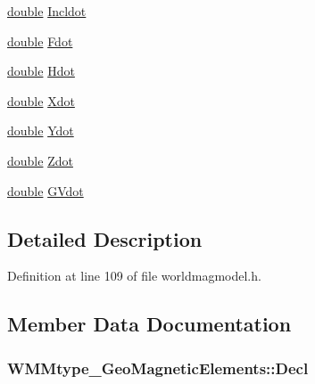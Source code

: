 \begin{DoxyCompactItemize}
\item 
\hyperlink{_super_l_u_support_8h_a8956b2b9f49bf918deed98379d159ca7}{double} \hyperlink{struct_w_m_mtype___geo_magnetic_elements_ad42b26463a764fbbe5fa6fe815d81f00}{Incldot}
\item 
\hyperlink{_super_l_u_support_8h_a8956b2b9f49bf918deed98379d159ca7}{double} \hyperlink{struct_w_m_mtype___geo_magnetic_elements_a9a1465364de801ea9a6567f63aeddff7}{Fdot}
\item 
\hyperlink{_super_l_u_support_8h_a8956b2b9f49bf918deed98379d159ca7}{double} \hyperlink{struct_w_m_mtype___geo_magnetic_elements_a4f48837b7b954edff150a6994ff80720}{Hdot}
\item 
\hyperlink{_super_l_u_support_8h_a8956b2b9f49bf918deed98379d159ca7}{double} \hyperlink{struct_w_m_mtype___geo_magnetic_elements_a98363bfa933b65aae742479e14dc209a}{Xdot}
\item 
\hyperlink{_super_l_u_support_8h_a8956b2b9f49bf918deed98379d159ca7}{double} \hyperlink{struct_w_m_mtype___geo_magnetic_elements_aaecfb6ce93c718489c1d0982d43d56b6}{Ydot}
\item 
\hyperlink{_super_l_u_support_8h_a8956b2b9f49bf918deed98379d159ca7}{double} \hyperlink{struct_w_m_mtype___geo_magnetic_elements_a105c49de1702144d115e20ba6272a2c6}{Zdot}
\item 
\hyperlink{_super_l_u_support_8h_a8956b2b9f49bf918deed98379d159ca7}{double} \hyperlink{struct_w_m_mtype___geo_magnetic_elements_abd5895b4add30e1d0a36e0b86ab9af22}{G\-Vdot}
\end{DoxyCompactItemize}


\subsection{Detailed Description}


Definition at line 109 of file worldmagmodel.\-h.



\subsection{Member Data Documentation}
\hypertarget{struct_w_m_mtype___geo_magnetic_elements_a683f5cce0a61ae941ac21ac3245b590a}{
\subsubsection[{Decl}]{ W\-M\-Mtype\-\_\-\-Geo\-Magnetic\-Elements\-::\-Decl}}\label{struct_w_m_mtype___geo_magnetic_elements_a683f5cce0a61ae941ac21ac3245b590a}


